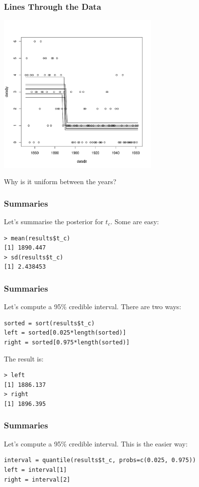 \documentclass{beamer}
\begin{document}
\begin{frame}
\frametitle{Lines Through the Data}
\begin{center}
\includegraphics[width=0.6\textwidth]{images/coal_lines.pdf} \\
\end{center}
Why is it uniform between the years?

\end{frame}


\begin{frame}[fragile]
\frametitle{Summaries}
Let's summarise the posterior for $t_c$. Some are easy:

\begin{verbatim}
> mean(results$t_c)
[1] 1890.447
> sd(results$t_c)
[1] 2.438453
\end{verbatim}

\end{frame}

\begin{frame}[fragile]
\frametitle{Summaries}
Let's compute a 95\% credible interval. There are two ways:

\begin{verbatim}
sorted = sort(results$t_c)
left = sorted[0.025*length(sorted)]
right = sorted[0.975*length(sorted)]
\end{verbatim}

The result is:
\begin{verbatim}
> left
[1] 1886.137
> right
[1] 1896.395
\end{verbatim}

\end{frame}


\begin{frame}[fragile]
\frametitle{Summaries}
Let's compute a 95\% credible interval. This is the easier way:
\begin{verbatim}
interval = quantile(results$t_c, probs=c(0.025, 0.975))
left = interval[1]
right = interval[2]
\end{verbatim}

\end{frame}
\end{document}
